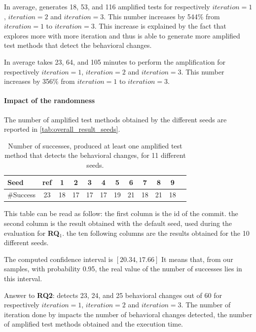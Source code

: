 In average, \DCII generates 18, 53, and 116 amplified tests for respectively $iteration=1$, $iteration=2$ and $iteration=3$. 
This number increases by 544\% from $iteration=1$ to $iteration=3$.
This increase is explained by the fact that \DCII explores more with more iteration and thus is able to generate more amplified test methods that detect the behavioral changes.

In average \DCII takes 23, 64, and 105 minutes to perform the amplification for respectively $iteration=1$, $iteration=2$ and $iteration=3$.
This number increases by 356\% from $iteration=1$ to $iteration=3$.



\paragraph{Impact of the randomness}

The number of amplified test methods obtained by the different seeds are reported in \autoref{tab:overall_result_seeds}.

\begin{table}
	\caption{Number of successes, \ie \DCI produced at least one amplified test method that detects the behavioral changes, for 11 different seeds.}
	\centering
	\label{tab:overall_result_seeds}
	\begin{tabular}{lccccccccccc}
		\toprule
		Seed	&	ref	&	1	&	2	&	3	&	4	&	5	&	6	&	7	&	8	&	9\\
		\midrule
		\rowcolor{gray!25}
		\#Success	&	23	&	18	&	17	&	17	&	17	&	19	&	21	&	18	&	21	&	18\\
		\bottomrule
	\end{tabular}
\end{table}

This table can be read as follow:
the first column is the id of the commit.
the second column is the result obtained with the default seed, used during the evaluation for \textbf{RQ$_1$}.
the ten following columns are the results obtained for the 10 different seeds.

The computed confidence interval is $\left[20.34, 17.66\right]$
It means that, from our samples, with probability 0.95, the real value of the number of successes lies in this interval.

\begin{mdframed}
Answer to \textbf{RQ2}: \DCII detects  23, 24, and 25 behavioral changes out of 60 for respectively $iteration=1$, $iteration=2$ and $iteration=3$.
The number of iteration done by \DCII impacts the number of behavioral changes detected, the number of amplified test methods obtained and the execution time.
\end{mdframed}

